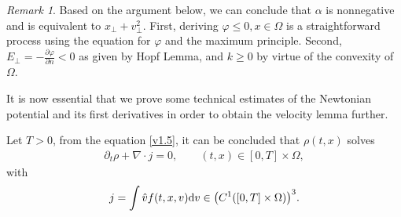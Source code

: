 \documentclass[11pt,reqno]{amsart}%
\newtheorem{Lemma}{Lemma}[section]
\theoremstyle{definition}
\theoremstyle{remark}
\newtheorem{Remark}{Remark}[section]
\begin{document}
\begin{Remark}
Based on the argument below, we can conclude that $\alpha$  is nonnegative and is equivalent to $x_{\bot}+v^{2}_{\bot}$. First, deriving $\varphi \leq 0, x\in\Omega$ is a straightforward process using the equation for $\varphi$ and the maximum principle. Second, $E_{\bot}=-\frac{\partial \varphi}{\partial n}< 0$ as given by Hopf Lemma, and $k\geq 0$ by virtue of the convexity of $\Omega$.
\end{Remark}

It is now essential that we prove some technical estimates of the Newtonian potential and its first derivatives in order to obtain the velocity lemma further.

Let $T>0$, from the equation \eqref{v1.5}, it can be concluded that $\rho(t,x)$ solves
\begin{align}
\partial_{t}\rho+\nabla\cdot j=0,\qquad  (t,x)\in[0,T]\times\Omega,\label{v7.3}
\end{align}
with $$j=\int\hat{v}f(t,x,v){\rm d}v \in \big(C^{1}([0,T]\times\Omega)\big)^{3}.$$
\end{document}

